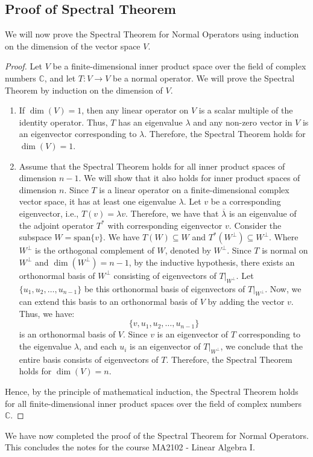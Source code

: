\documentclass[openany]{book}
\renewcommand{\C}{\mathbb{C}}
\begin{document}
\subsection{Proof of Spectral Theorem}
We will now prove the Spectral Theorem for Normal Operators using induction on the dimension of the vector space $V$.
\begin{proof}
Let $V$ be a finite-dimensional inner product space over the field of complex numbers $\C$, and let $T: V \to V$ be a normal operator. We will prove the Spectral Theorem by induction on the dimension of $V$.
\begin{enumerate}
    \item {} If $\dim(V) = 1$, then any linear operator on $V$ is a scalar multiple of the identity operator. Thus, $T$ has an eigenvalue $\lambda$ and any non-zero vector in $V$ is an eigenvector corresponding to $\lambda$. Therefore, the Spectral Theorem holds for $\dim(V) = 1$.
    \item {} Assume that the Spectral Theorem holds for all inner product spaces of dimension $n-1$. We will show that it also holds for inner product spaces of dimension $n$. Since $T$ is a linear operator on a finite-dimensional complex vector space, it has at least one eigenvalue $\lambda$. Let $v$ be a corresponding eigenvector, i.e., $T(v) = \lambda v$. Therefore, we have that $\overline{\lambda}$ is an eigenvalue of the adjoint operator $T^*$ with corresponding eigenvector $v$. Consider the subspace $W = \text{span}\{v\}$. We have $T(W) \subseteq W$ and $T^*(W^\perp) \subseteq W^\perp$. Where $W^\perp$ is the orthogonal complement of $W$, denoted by $W^\perp$. Since $T$ is normal on $W^\perp$ and $\dim(W^\perp) = n-1$, by the inductive hypothesis, there exists an orthonormal basis of $W^\perp$ consisting of eigenvectors of $T|_{W^\perp}$. Let $\{u_1, u_2, \ldots, u_{n-1}\}$ be this orthonormal basis of eigenvectors of $T|_{W^\perp}$. Now, we can extend this basis to an orthonormal basis of $V$ by adding the vector $v$. Thus, we have:
    $$\{v, u_1, u_2, \ldots, u_{n-1}\}$$
    is an orthonormal basis of $V$. Since $v$ is an eigenvector of $T$ corresponding to the eigenvalue $\lambda$, and each $u_i$ is an eigenvector of $T|_{W^\perp}$, we conclude that the entire basis consists of eigenvectors of $T$. Therefore, the Spectral Theorem holds for $\dim(V) = n$.
\end{enumerate}
Hence, by the principle of mathematical induction, the Spectral Theorem holds for all finite-dimensional inner product spaces over the field of complex numbers $\C$.
\end{proof}
We have now completed the proof of the Spectral Theorem for Normal Operators. This concludes the notes for the course MA2102 - Linear Algebra I. 
\end{document}

